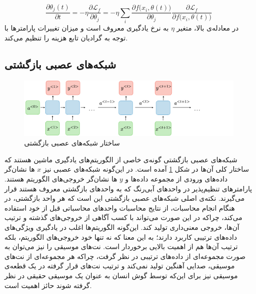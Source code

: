 \begin{equation}
    \frac{\partial \theta_j(t)}{\partial t} = - \eta \frac{\partial \mathcal{L}_f}{\partial \theta_j}
    = - \eta \sum_i \frac{\partial f \big(x_i, \theta (t)\big)}{\partial \theta_j} \frac{\partial \mathcal{L}_f}{\partial f \big(x_i, \theta(t)\big)}
\end{equation}
در معادله‌ی بالا، متغیر
$\eta$
به نرخ یادگیری 
معروف است و میزان تغییرات پارامترها با توجه به گرادیان تابع هزینه را تنظیم می‌کند.


\subsection{
شبکه‌های عصبی بازگشتی
}

\begin{figure}
	\centering
	\includegraphics[scale=0.35]{figures/architecture-rnn.png}
	\caption [
	ساختار شبکه‌های عصبی بازگشتی
	]{
	ساختار شبکه‌های عصبی بازگشتی 
	\cite{rnncheat}
	}
	\label{fig:rnnarch}
\end{figure}

شبکه‌های عصبی بازگشتی
گونه‌ی خاصی از الگوریتم‌های یادگیری ماشین هستند که ساختار کلی آن‌ها در شکل
\ref{fig:rnnarch}
آمده است.
در این‌گونه شبکه‌های عصبی نیز
$x$
ها نشان‌گر داده‌های ورودی از مجموعه داده‌ها و
$y$
ها نشان‌گر خروجی‌های الگوریتم هستند.
پارامترهای تنظیم‌پذیر در واحد‌های آبی‌رنگ که به 
واحد‌های بازگشتی
معروف هستند قرار می‌گیرند.
نکته‌ی اصلی شبکه‌های عصبی بازگشتی این است که هر واحد بازگشتی، در هنگام انجام محاسبات، از نتایج محاسبات واحد‌های محاسباتی قبل از خود استفاده می‌کند، چراکه در این صورت می‌تواند با کسب آگاهی از خروجی‌های گذشته و ترتیب آن‌ها، خروجی معنی‌داری تولید کند.
این‌گونه الگوریتم‌ها اغلب در یادگیری ویژگی‌های داده‌های ترتیبی
کاربرد دارند؛ به این معنا که نه تنها خود خروجی‌های الگوریتم، بلکه ترتیب آن‌ها هم از اهمیت بالایی برخوردار است.
نت‌های موسیقی را نیز می‌توان به صورت مجموعه‌ای از داده‌های ترتیبی در نظر گرفت، چراکه هر مجموعه‌ای از نت‌های موسیقی، صدایی آهنگین تولید نمی‌کند و ترتیب نت‌های قرار گرفته در یک قطعه‌ی موسیقی نیز برای این‌که توسط گوش انسان به عنوان یک موسیقی حقیقی در نظر گرفته شوند حائز اهمیت است.

